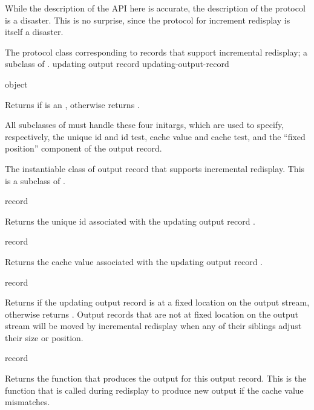  {While the description of the API here is accurate, the description
of the protocol is a disaster.  This is no surprise, since the protocol for
increment redisplay is itself a disaster.}


The protocol class corresponding to records that support incremental redisplay;
a subclass of .
 {updating output record} {updating-output-record}

 {object}

Returns  if  is an ,
otherwise returns .


All subclasses of  must handle these four initargs,
which are used to specify, respectively, the unique id and id test, cache value
and cache test, and the ``fixed position'' component of the output record.


The instantiable class of output record that supports incremental redisplay.
This is a subclass of .


 {record}

Returns the unique id associated with the updating output record .

 {record}

Returns the cache value associated with the updating output record .

 {record}

Returns  if the updating output record  is at a fixed
location on the output stream, otherwise returns .  Output records
that are not at fixed location on the output stream will be moved by incremental
redisplay when any of their siblings adjust their size or position.

 {record}

Returns the function that produces the output for this output record.  This is
the function that is called during redisplay to produce new output if the cache
value mismatches.


